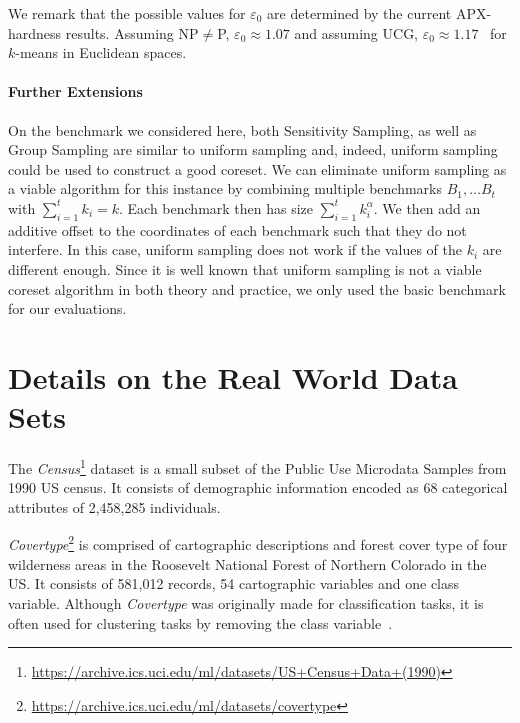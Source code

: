 We remark that the possible values for $\varepsilon_0$ are determined by the current APX-hardness results. Assuming NP$\neq$P, $\varepsilon_0\approx 1.07$ and assuming UCG, $\varepsilon_0 \approx 1.17$~\cite{Cohen-AddadSL21,Cohen-AddadS19} for $k$-means in Euclidean spaces.



\paragraph*{Further Extensions}

On the benchmark we considered here, both Sensitivity Sampling, as well as Group Sampling are similar to uniform sampling and, indeed, uniform sampling could be used to construct a good coreset. We can eliminate uniform sampling as a viable algorithm for this instance by combining multiple benchmarks $B_1,\ldots B_t$ with $\sum_{i=1}^t  k_i =k$. Each benchmark then has size $\sum_{i=1}^t  k_i^{\alpha}$. We then add an additive offset to the coordinates of each benchmark such that they do not interfere. In this case, uniform sampling does not work if the values of the $k_i$ are different enough. Since it is well known that uniform sampling is not a viable coreset algorithm in both theory and practice, we only used the basic benchmark for our evaluations.





\section{Details on the Real World Data Sets}
\label{sec:real-world-datasets-details}

The \textit{Census}\footnote{\url{https://archive.ics.uci.edu/ml/datasets/US+Census+Data+(1990)}} dataset is a small subset of the Public Use Microdata Samples from 1990 US census. It consists of demographic information encoded as 68 categorical attributes of 2,458,285 individuals. 

\textit{Covertype}\footnote{\url{https://archive.ics.uci.edu/ml/datasets/covertype}} is comprised of cartographic descriptions and forest cover type of four wilderness areas in the Roosevelt National Forest of Northern Colorado in the US. It consists of 581,012 records, 54 cartographic variables and one class variable. Although \textit{Covertype} was originally made for classification tasks, it is often used for clustering tasks by removing the class variable~\cite{AckermannMRSLS12}.

